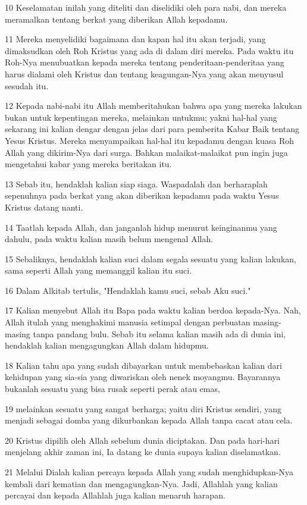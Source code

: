 \par 10 Keselamatan inilah yang diteliti dan diselidiki oleh para nabi, dan mereka meramalkan tentang berkat yang diberikan Allah kepadamu.
\par 11 Mereka menyelidiki bagaimana dan kapan hal itu akan terjadi, yang dimaksudkan oleh Roh Kristus yang ada di dalam diri mereka. Pada waktu itu Roh-Nya menubuatkan kepada mereka tentang penderitaan-penderitaa yang harus dialami oleh Kristus dan tentang keagungan-Nya yang akan menyusul sesudah itu.
\par 12 Kepada nabi-nabi itu Allah memberitahukan bahwa apa yang mereka lakukan bukan untuk kepentingan mereka, melainkan untukmu; yakni hal-hal yang sekarang ini kalian dengar dengan jelas dari para pemberita Kabar Baik tentang Yesus Kristus. Mereka menyampaikan hal-hal itu kepadamu dengan kuasa Roh Allah yang dikirim-Nya dari surga. Bahkan malaikat-malaikat pun ingin juga mengetahui kabar yang mereka beritakan itu.
\par 13 Sebab itu, hendaklah kalian siap siaga. Waspadalah dan berharaplah sepenuhnya pada berkat yang akan diberikan kepadamu pada waktu Yesus Kristus datang nanti.
\par 14 Taatlah kepada Allah, dan janganlah hidup menurut keinginanmu yang dahulu, pada waktu kalian masih belum mengenal Allah.
\par 15 Sebaliknya, hendaklah kalian suci dalam segala sesuatu yang kalian lakukan, sama seperti Allah yang memanggil kalian itu suci.
\par 16 Dalam Alkitab tertulis, "Hendaklah kamu suci, sebab Aku suci."
\par 17 Kalian menyebut Allah itu Bapa pada waktu kalian berdoa kepada-Nya. Nah, Allah itulah yang menghakimi manusia setimpal dengan perbuatan masing-masing tanpa pandang bulu. Sebab itu selama kalian masih ada di dunia ini, hendaklah kalian mengagungkan Allah dalam hidupmu.
\par 18 Kalian tahu apa yang sudah dibayarkan untuk membebaskan kalian dari kehidupan yang sia-sia yang diwariskan oleh nenek moyangmu. Bayarannya bukanlah sesuatu yang bisa rusak seperti perak atau emas,
\par 19 melainkan sesuatu yang sangat berharga; yaitu diri Kristus sendiri, yang menjadi sebagai domba yang dikurbankan kepada Allah tanpa cacat atau cela.
\par 20 Kristus dipilih oleh Allah sebelum dunia diciptakan. Dan pada hari-hari menjelang akhir zaman ini, Ia datang ke dunia supaya kalian diselamatkan.
\par 21 Melalui Dialah kalian percaya kepada Allah yang sudah menghidupkan-Nya kembali dari kematian dan mengagungkan-Nya. Jadi, Allahlah yang kalian percayai dan kepada Allahlah juga kalian menaruh harapan.
